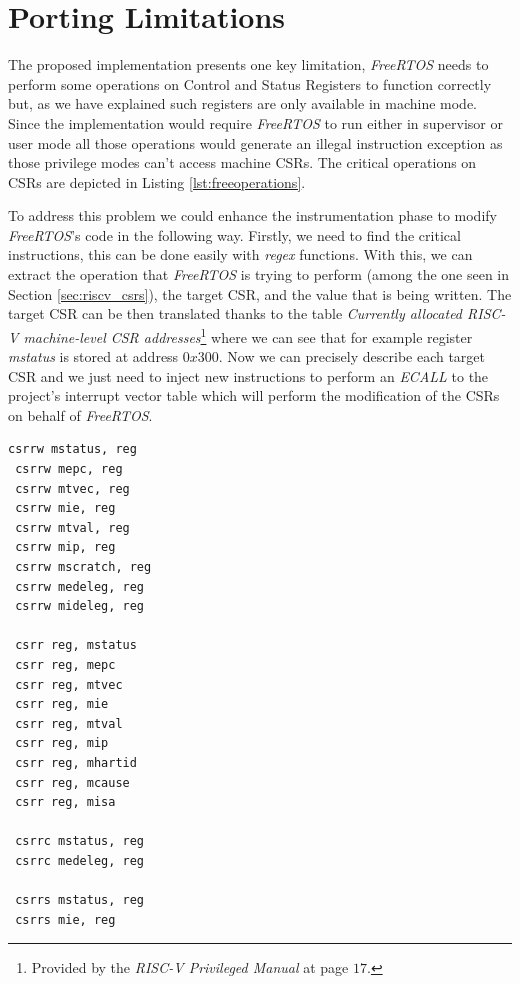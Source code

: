 \section{Porting Limitations}
\label{sec:rtos_limitations}

The proposed implementation presents one key limitation, \textit{FreeRTOS} needs
to perform some operations on Control and Status Registers to function correctly
but, as we have explained such registers are only available in machine mode.
Since the implementation would require \textit{FreeRTOS} to run either in supervisor
or user mode all those operations would generate an illegal instruction exception
as those privilege modes can't access machine CSRs. The critical operations on
CSRs are depicted in Listing \ref{lst:freeoperations}.

To address this problem we could enhance the instrumentation phase to modify
\textit{FreeRTOS}'s code in the following way. Firstly, we need to find the critical
instructions, this can be done easily with \textit{regex} functions. With this, we
can extract the operation that \textit{FreeRTOS} is trying to perform (among the
one seen in Section \ref{sec:riscv_csrs}), the target CSR, and the value that is
being written. The target CSR can be then translated thanks to the table \textit{Currently
allocated RISC-V machine-level CSR addresses}\footnote{Provided by the \textit{RISC-V
Privileged Manual}\cite{riscv} at page $17$.} where we can see that for example register
\textit{mstatus} is stored at address $0x300$. Now we can precisely describe each
target CSR and we just need to inject new instructions to perform an \textit{ECALL}
to the project's interrupt vector table which will perform the modification of
the CSRs on behalf of \textit{FreeRTOS}. \\
\begin{lstlisting}[style=Assembly, caption = \textit{FreeRTOS} operations on Control and Status Registers, label={lst:freeoperations}]
 csrrw mstatus, reg
 csrrw mepc, reg
 csrrw mtvec, reg
 csrrw mie, reg
 csrrw mtval, reg
 csrrw mip, reg
 csrrw mscratch, reg
 csrrw medeleg, reg
 csrrw mideleg, reg

 csrr reg, mstatus
 csrr reg, mepc
 csrr reg, mtvec
 csrr reg, mie
 csrr reg, mtval
 csrr reg, mip
 csrr reg, mhartid
 csrr reg, mcause
 csrr reg, misa

 csrrc mstatus, reg
 csrrc medeleg, reg

 csrrs mstatus, reg
 csrrs mie, reg
\end{lstlisting}

